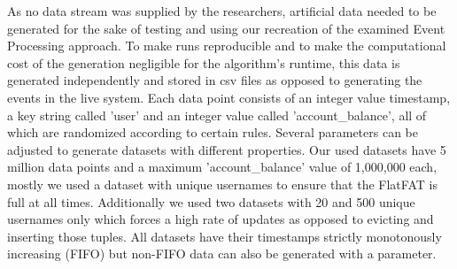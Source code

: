 As no data stream was supplied by the researchers, artificial data needed to be generated
for the sake of testing and using our recreation of the examined Event Processing approach.
To make runs reproducible and to make the computational cost of the generation negligible
for the algorithm's runtime, this data is generated independently and stored in csv files
as opposed to generating the events in the live system.
Each data point consists of an integer value timestamp, a key string called 'user' and
an integer value called 'account\_balance', all of which are randomized according to certain rules.
Several parameters can be adjusted to generate datasets with different properties.
Our used datasets have 5 million data points and a maximum 'account\_balance' value of 1,000,000 each,
mostly we used a dataset with unique usernames to ensure that the FlatFAT is full at all times.
Additionally we used two datasets with 20 and 500 unique usernames only
which forces a high rate of updates as opposed to evicting and inserting those tuples.
All datasets have their timestamps strictly monotonously increasing (FIFO)
but non-FIFO data can also be generated with a parameter.

